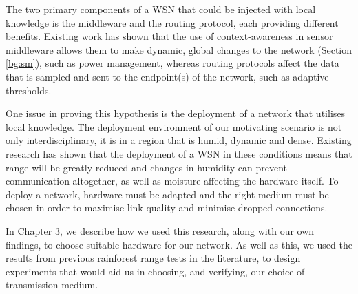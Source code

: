The two primary components of a WSN that could be injected with local knowledge is the middleware and the routing protocol, each providing different benefits. Existing work has shown that the use of context-awareness in sensor middleware allows them to make dynamic, global changes to the network (Section \ref{bg:sm}), such as power management, whereas routing protocols affect the data that is sampled and sent to the endpoint(s) of the network, such as adaptive thresholds.

One issue in proving this hypothesis is the deployment of a network that utilises local knowledge. The deployment environment of our motivating scenario is not only interdisciplinary, it is in a region that is humid, dynamic and dense. Existing research has shown that the deployment of a WSN in these conditions means that range will be greatly reduced \cite{Figueiredo2009} and changes in humidity can prevent communication altogether, as well as moisture affecting the hardware itself.
To deploy a network, hardware must be adapted and the right medium must be chosen in order to maximise link quality and minimise dropped connections.

In Chapter 3, we describe how we used this research, along with our own findings, to choose suitable hardware for our network. As well as this, we used the results from previous rainforest range tests in the literature, to design  experiments that would aid us in choosing, and verifying, our choice of transmission medium.


